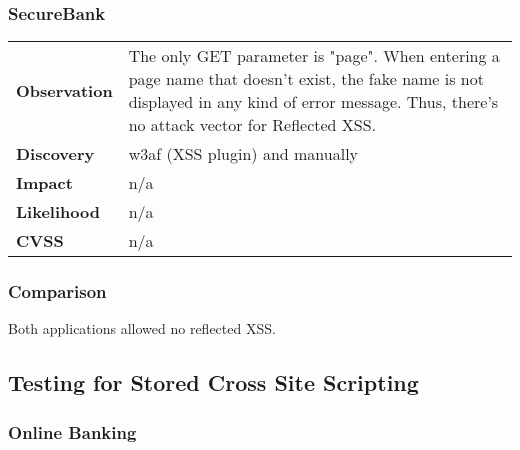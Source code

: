 \subsubsection*{SecureBank}

\begin{tabular}{l|p{10cm}}
\textbf{Observation} & The only GET parameter is "page". When entering a page name that doesn't exist, the fake name is not displayed in any kind of error message. Thus, there's no attack vector for Reflected XSS. \\
\textbf{Discovery} & w3af (XSS plugin) and manually \\
\textbf{Impact} & n/a \\
\textbf{Likelihood} & n/a \\
\textbf{CVSS} & n/a \\
\end{tabular}

\subsubsection*{Comparison}
Both applications allowed no reflected XSS.

\subsection{Testing for Stored Cross Site Scripting}

\subsubsection*{Online Banking}

